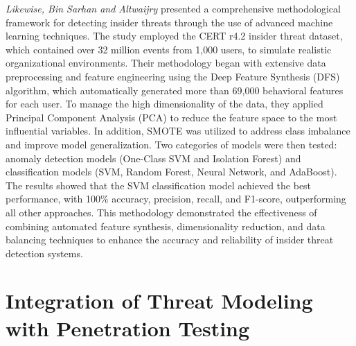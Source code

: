 \textit{Likewise, Bin Sarhan and Altwaijry} presented a comprehensive methodological framework for detecting insider threats through the use of advanced machine learning techniques. The study employed the CERT r4.2 insider threat dataset, which contained over 32 million events from 1,000 users, to simulate realistic organizational environments. Their methodology began with extensive data preprocessing and feature engineering using the Deep Feature Synthesis (DFS) algorithm, which automatically generated more than 69,000 behavioral features for each user. To manage the high dimensionality of the data, they applied Principal Component Analysis (PCA) to reduce the feature space to the most influential variables. In addition, SMOTE was utilized to address class imbalance and improve model generalization. Two categories of models were then tested: anomaly detection models (One-Class SVM and Isolation Forest) and classification models (SVM, Random Forest, Neural Network, and AdaBoost). The results showed that the SVM classification model achieved the best performance, with 100\% accuracy, precision, recall, and F1-score, outperforming all other approaches. This methodology demonstrated the effectiveness of combining automated feature synthesis, dimensionality reduction, and data balancing techniques to enhance the accuracy and reliability of insider threat detection systems. \cite{binsarhan2023}

\section{Integration of Threat Modeling with Penetration Testing}


